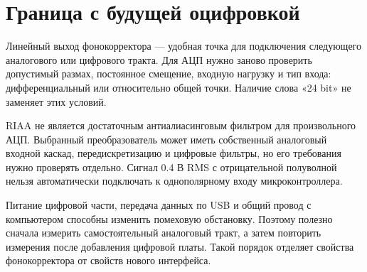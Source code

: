 \documentclass[a4paper,11pt]{article}
\begin{document}
\section{Граница с будущей оцифровкой}

Линейный выход фонокорректора — удобная точка для подключения следующего
аналогового или цифрового тракта. Для АЦП нужно заново проверить допустимый
размах, постоянное смещение, входную нагрузку и тип входа: дифференциальный
или относительно общей точки. Наличие слова «24 bit» не заменяет этих условий.

RIAA не является достаточным антиалиасинговым фильтром для произвольного
АЦП. Выбранный преобразователь может иметь собственный аналоговый входной
каскад, передискретизацию и цифровые фильтры, но его требования нужно
проверять отдельно. Сигнал 0.4 В RMS с отрицательной полуволной нельзя автоматически подключать
к однополярному входу микроконтроллера.

Питание цифровой части, передача данных по USB и общий провод с компьютером
способны изменить помеховую обстановку. Поэтому полезно сначала измерить
самостоятельный аналоговый тракт, а затем повторить измерения после добавления
цифровой платы. Такой порядок отделяет свойства фонокорректора от свойств
нового интерфейса.
\end{document}
